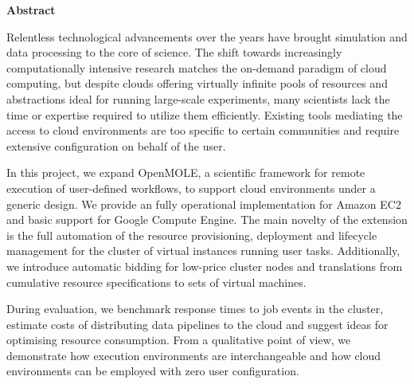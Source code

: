 \thispagestyle{empty}

\begin{center}
\vspace*{4cm}
\textbf{Abstract}
\end{center}

\vspace*{0.3cm}
\begin{spacing}{1.0}
Relentless technological advancements over the years have brought simulation and data processing to the core of science. The shift towards increasingly computationally intensive research matches the on-demand paradigm of cloud computing, but despite clouds offering virtually infinite pools of resources and abstractions ideal for running large-scale experiments, many scientists lack the time or expertise required to utilize them efficiently. Existing tools mediating the access to cloud environments are too specific to certain communities and require extensive configuration on behalf of the user. 

In this project, we expand OpenMOLE, a scientific framework for remote execution of user-defined workflows, to support cloud environments under a generic design. We provide an fully operational implementation for Amazon EC2 and basic support for Google Compute Engine. The main novelty of the extension is the full automation of the resource provisioning, deployment and lifecycle management for the cluster of virtual instances running user tasks. Additionally, we introduce automatic bidding for low-price cluster nodes and translations from cumulative resource specifications to sets of virtual machines.

During evaluation, we benchmark response times to job events in the cluster, estimate costs of distributing data pipelines to the cloud and suggest ideas for optimising resource consumption. From a qualitative point of view, we demonstrate how execution environments are interchangeable and how cloud environments can be employed with zero user configuration.
\end{spacing}

\newpage
\blankpage









